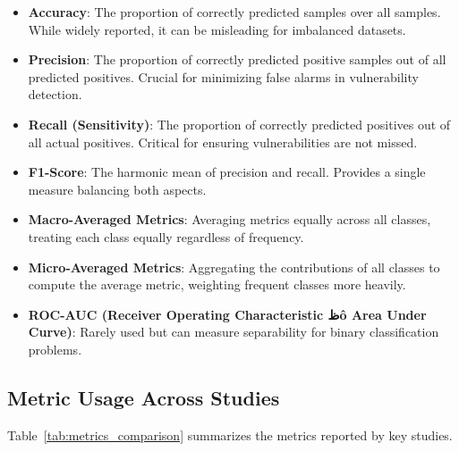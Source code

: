 \begin{itemize}
    \item \textbf{Accuracy}: The proportion of correctly predicted samples over all samples. While widely reported, it can be misleading for imbalanced datasets.
    
    \item \textbf{Precision}: The proportion of correctly predicted positive samples out of all predicted positives. Crucial for minimizing false alarms in vulnerability detection.
    
    \item \textbf{Recall (Sensitivity)}: The proportion of correctly predicted positives out of all actual positives. Critical for ensuring vulnerabilities are not missed.
    
    \item \textbf{F1-Score}: The harmonic mean of precision and recall. Provides a single measure balancing both aspects.
    
    \item \textbf{Macro-Averaged Metrics}: Averaging metrics equally across all classes, treating each class equally regardless of frequency.
    
    \item \textbf{Micro-Averaged Metrics}: Aggregating the contributions of all classes to compute the average metric, weighting frequent classes more heavily.
    
    \item \textbf{ROC-AUC (Receiver Operating Characteristic ظô Area Under Curve)}: Rarely used but can measure separability for binary classification problems.
\end{itemize}

\subsection*{Metric Usage Across Studies}

Table~\ref{tab:metrics_comparison} summarizes the metrics reported by key studies.

